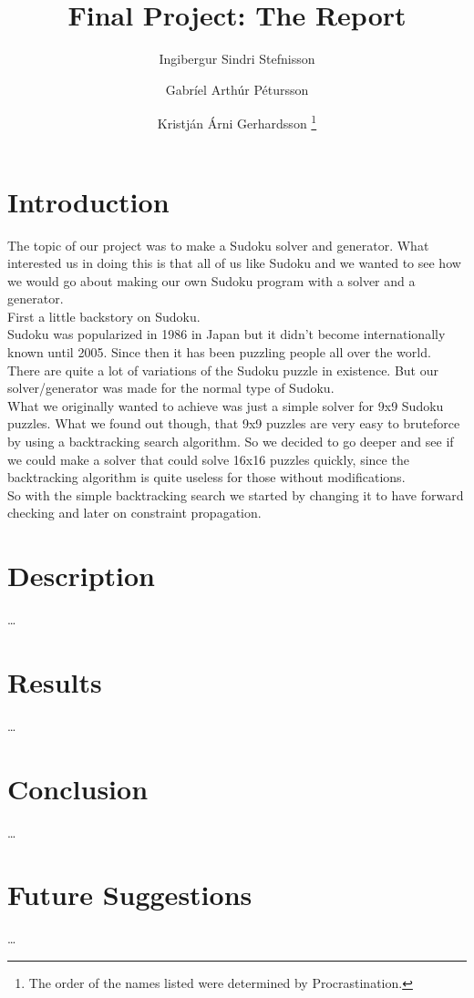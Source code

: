 \documentclass[12pt,a4paper]{article}
\title{Final Project: The Report}
\author{Ingibergur Sindri Stefnisson \and Gabríel Arthúr Pétursson \and Kristján Árni Gerhardsson
	\footnote{The order of the names listed were determined by Procrastination.}}
\begin{document}
\maketitle

\clearpage


\section*{Introduction}

The topic of our project was to make a Sudoku solver and generator. What interested
us in doing this is that all of us like Sudoku and we wanted to see how we would
go about making our own Sudoku program with a solver and a generator.\\

First a little backstory on Sudoku.\\

Sudoku was popularized in 1986 in Japan but it didn't become internationally known
until 2005. Since then it has been puzzling people all over the world. 
There are quite a lot of variations of the Sudoku puzzle in existence. But our 
solver/generator was made for the normal type of Sudoku.\\

What we originally wanted to achieve was just a simple solver for 9x9 Sudoku puzzles.
What we found out though, that 9x9 puzzles are very easy to bruteforce by using
a backtracking search algorithm. So we decided to go deeper and see if we could
make a solver that could solve 16x16 puzzles quickly, since the backtracking algorithm
is quite useless for those without modifications.\\

So with the simple backtracking search we started by changing it to have forward 
checking and later on constraint propagation.

\section*{Description}

\ldots

\section*{Results}%

\ldots

\section*{Conclusion}

\ldots

\section*{Future Suggestions}

\ldots
\end{document}
